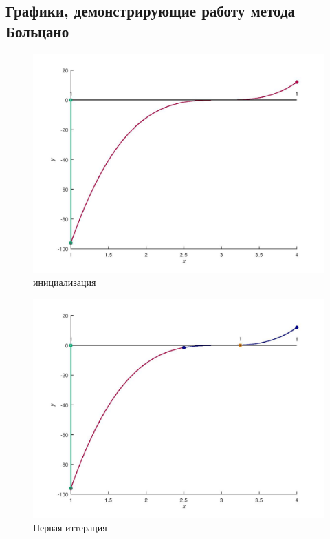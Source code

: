\documentclass[a4paper,12pt]{article}
\begin{document}
\subsection*{Графики, демонстрирующие работу метода Больцано}
    \begin{figure}[H]
        \centering
        \includegraphics[scale=0.4]{0Bolcanoitter.jpg}
        \caption{инициализация}
    \end{figure}
    \begin{figure}[H]
        \centering
        \includegraphics[scale=0.4]{1Bolcanoitter.jpg}
        \caption{Первая иттерация}
    \end{figure}
\end{document}
